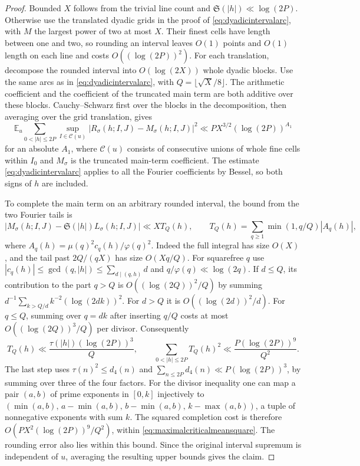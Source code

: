\documentclass[11pt,a4paper]{article}
\numberwithin{equation}{section}
\newcommand{\SSS}{\mathfrak S}
\begin{document}
\begin{proof}
Bounded $X$ follows from the trivial line count and
$\SSS(|h|)\ll\log(2P)$. Otherwise use the translated
dyadic grids in the proof of \cref{eq:dyadicintervalarc},
with $M$ the largest power of two at most $X$.
Their finest cells have length between one and two,
so rounding an interval leaves $O(1)$ points and
$O(1)$ length on each line and costs $O((\log(2P))^2)$.
For each translation, decompose the rounded interval
into $O(\log(2X))$ whole dyadic blocks. Use the same
arcs as in \cref{eq:dyadicintervalarc}, with
$Q=\lfloor\sqrt X/8\rfloor$. The arithmetic coefficient
and the coefficient of the truncated main term are both
additive over these blocks. Cauchy--Schwarz first over
the blocks in the decomposition, then averaging over
the grid translation, gives
\[
 \mathbb E_u \sum_{0<|h|\le2P}
      \sup_{I\in\mathcal C(u)}
        |R_\sigma(h;I,J)-M_\sigma(h;I,J)|^2
  \ll P X^{3/2}(\log(2P))^{A_1}
\]
for an absolute $A_1$, where $\mathcal C(u)$ consists
of consecutive unions of whole fine cells within $I_0$
and $M_\sigma$ is the truncated main-term coefficient.
The estimate
\cref{eq:dyadicintervalarc} applies to all the Fourier
coefficients by Bessel, so both signs of $h$ are included.

To complete the main term on an arbitrary rounded
interval, the bound from the two Fourier tails is
\[
 |M_\sigma(h;I,J)-\SSS(|h|)L_\sigma(h;I,J)|
 \ll X T_Q(h),\qquad
 T_Q(h)=\sum_{q\ge1}\min(1,q/Q)|A_q(h)|,
\]
where $A_q(h)=\mu(q)^2c_q(h)/\varphi(q)^2$.
Indeed the full integral has size $O(X)$, and the
tail past $2Q/(qX)$ has size $O(Xq/Q)$.
For squarefree $q$ use
$|c_q(h)|\le\gcd(q,|h|)\le\sum_{d\mid(q,h)}d$
and $q/\varphi(q)\ll\log(2q)$. If $d\le Q$, its
contribution to the part $q>Q$ is
$O((\log(2Q))^2/Q)$ by summing
$d^{-1}\sum_{k>Q/d}k^{-2}(\log(2dk))^2$.
For $d>Q$ it is $O((\log(2d))^2/d)$.
For $q\le Q$, summing over $q=dk$ after inserting $q/Q$
costs at most $O((\log(2Q))^3/Q)$ per divisor.
Consequently
\[
 T_Q(h)\ll \frac{\tau(|h|)(\log(2P))^3}{Q},
 \qquad
 \sum_{0<|h|\le2P}T_Q(h)^2\ll
          \frac{P(\log(2P))^9}{Q^2}.
\]
The last step uses $\tau(n)^2\le d_4(n)$ and
$\sum_{n\le 2P}d_4(n)\ll P(\log(2P))^3$, by summing
over three of the four factors. For the divisor inequality
one can map a pair $(a,b)$ of prime exponents in $[0,k]$
injectively to
$(\min(a,b),\,a-\min(a,b),\,b-\min(a,b),\,k-\max(a,b))$,
a tuple of nonnegative exponents with sum $k$.
The squared completion cost is therefore
$O(PX^2(\log(2P))^9/Q^2)$, within
\cref{eq:maximalcriticalmeansquare}. The rounding error
also lies within this bound. Since the original interval
supremum is independent of $u$, averaging the resulting
upper bounds gives the claim.
\end{proof}
\end{document}
